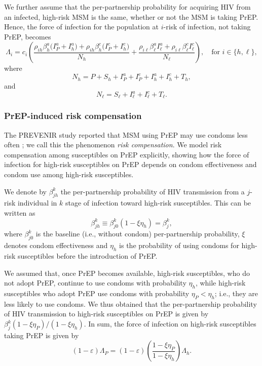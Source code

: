 \documentclass[12pt]{article}
\begin{document}
We further assume that the per-partnership probability for acquiring HIV from an infected, high-risk MSM is the same, whether or not the MSM is taking PrEP. Hence, the force of infection for the population at $i$-risk of infection, not taking PrEP, becomes
\begin{equation}
	\Lambda_i	 = c_i \left( \frac{\rho_{ih} \beta_h^a \big(I_P^a + I_h^a\big) + \rho_{ih} \beta_h^c \big(I_P^c +I_h^c \big)}{N_h} + \frac{\rho_{i\ell} \beta_\ell^a I_\ell^a + \rho_{i\ell} \beta_\ell^c I_\ell^c}{N_\ell}\right), \quad \text{for } i \in\{h,\ell\},
\end{equation}
where
\begin{equation}
N_h = P + S_h + I_P^a + I_P^c + I_h^a + I_h^c + T_h,
\end{equation}
and
\begin{equation}
N_\ell = S_\ell + I_\ell^ a + I_\ell^c + T_\ell.
\end{equation}


\subsubsection{PrEP-induced risk compensation} \label{sec:RiskCompensation}

The PREVENIR study reported that MSM using PrEP may use condoms less often \cite{Molina2018}; we call this the phenomenon {\it risk compensation}. We model risk compensation among susceptibles on PrEP explicitly, showing how the force of infection for high-risk susceptibles on PrEP depends on condom effectiveness and condom use among high-risk susceptibles.

We denote by $\beta_{jh}^k$ the per-partnership probability of HIV transmission from a $j$-risk individual in $k$ stage of infection toward high-risk susceptibles. This can be written as
 \begin{equation}
 	\beta_{jh}^k \equiv \beta_{j 0}^k(1-\xi \eta_h) = \beta_j^k,
 \end{equation}
where $\beta_{j 0}^k$ is the baseline (i.e., without condom) per-partnership probability, $\xi$ denotes condom effectiveness and $\eta_h$ is the probability of using condoms for high-risk susceptibles before the introduction of PrEP.

We assumed that, once PrEP becomes available, high-risk susceptibles, who do not adopt PrEP, continue to use condoms with probability $\eta_h$, while high-risk susceptibles who adopt PrEP use condoms with probability $\eta_P < \eta_h$; i.e., they are less likely to use condoms. We thus obtained that the per-partnership probability of HIV transmission to high-risk susceptibles on PrEP is given by $\beta_j^k (1-\xi \eta_P)/(1-\xi \eta_h)$. In sum, the force of infection on high-risk susceptibles taking PrEP is given by
\begin{equation}
	(1-\varepsilon) \Lambda_P = (1-\varepsilon) \left(\frac{1-\xi \eta_P}{1-\xi \eta_h}\right) \Lambda_h.
\end{equation}
\end{document}
